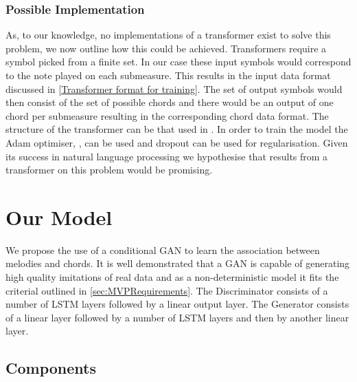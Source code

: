 \subsubsection{Possible Implementation}
As, to our knowledge, no implementations of a transformer exist to solve this problem, we now outline how this could be achieved.
Transformers require a symbol picked from a finite set. 
In our case these input symbols would correspond to the note played on each submeasure.
This results in the input data format discussed in \autoref{Transformer format for training}.
The set of output symbols would then consist of the set of possible chords and there would be an output of one chord per submeasure resulting in the corresponding chord data format.
The structure of the transformer can be that used in \cite{Transformers}.
In order to train the model the Adam optimiser, \cite{Adam}, can be used and dropout can be used for regularisation.
Given its success in natural language processing we hypothesise that results from a transformer on this problem would be promising.

\section{Our Model}

We propose the use of a conditional GAN to learn the association between melodies and chords.
It is well demonstrated that a GAN is capable of generating high quality imitations of real data and as a non-deterministic model it fits the criterial outlined in \autoref{sec:MVPRequirements}.
The Discriminator consists of a number of LSTM layers followed by a linear output layer.
The Generator consists of a linear layer followed by a number of LSTM layers and then by another linear layer.
\subsection{Components}

